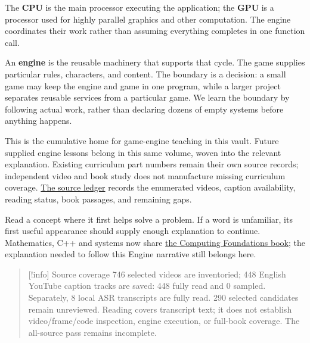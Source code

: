The \textbf{CPU} is the main processor executing the application; the \textbf{GPU} is a processor used for highly parallel graphics and other computation. The engine coordinates their work rather than assuming everything completes in one function call.

An \textbf{engine} is the reusable machinery that supports that cycle. The game supplies particular rules, characters, and content. The boundary is a decision: a small game may keep the engine and game in one program, while a larger project separates reusable services from a particular game. We learn the boundary by following actual work, rather than declaring dozens of empty systems before anything happens.

This is the cumulative home for game-engine teaching in this vault. Future supplied engine lessons belong in this same volume, woven into the relevant explanation. Existing curriculum part numbers remain their own source records; independent video and book study does not manufacture missing curriculum coverage. \hyperref[appendix-877738f6f4d2]{The source ledger} records the enumerated videos, caption availability, reading status, book passages, and remaining gaps.

Read a concept where it first helps solve a problem. If a word is unfamiliar, its first useful appearance should supply enough explanation to continue. Mathematics, C++ and systems now share \hyperref[volume-reading-map]{the Computing Foundations book}; the explanation needed to follow this Engine narrative still belongs here.

\begin{quote}
{[}!info{]} Source coverage 746 selected videos are inventoried; 448 English YouTube caption tracks are saved: 448 fully read and 0 sampled. Separately, 8 local ASR transcripts are fully read. 290 selected candidates remain unreviewed. Reading covers transcript text; it does not establish video/frame/code inspection, engine execution, or full-book coverage. The all-source pass remains incomplete.
\end{quote}


